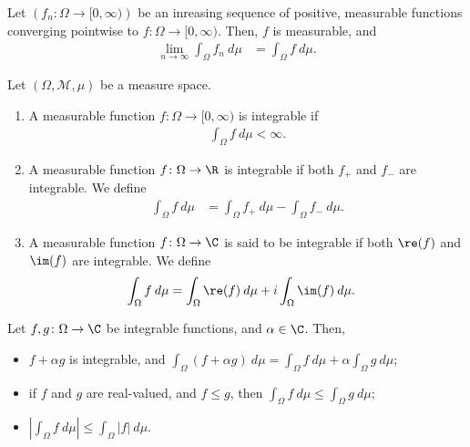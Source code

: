\begin{theorem}
  Let $\left(f_n:\Omega\rightarrow [0,\infty)\right)$ be an inreasing sequence of positive, measurable functions converging pointwise to $f\colon \Omega\rightarrow [0,\infty)$. Then, $f$ is measurable, and
  \begin{align*}
    \lim_{n\rightarrow\infty}\int_{\Omega}^{} f_n\:d\mu &= \int_{\Omega}^{} f\:d\mu.
  \end{align*}
\end{theorem}
\begin{definition}
  Let $\left(\Omega,\mathcal{M},\mu\right)$ be a measure space.
  \begin{enumerate}[(1)]
    \item A measurable function $f\colon \Omega\rightarrow [0,\infty)$ is integrable if
      \begin{align*}
        \int_{\Omega}^{} f\:d\mu < \infty.
      \end{align*}
    \item A measurable function $f\colon \Omega\rightarrow \R$ is integrable if both $f_{+}$ and $f_{-}$ are integrable. We define
      \begin{align*}
        \int_{\Omega}^{} f\:d\mu &= \int_{\Omega}^{} f_{+}\:d\mu - \int_{\Omega}^{} f_{-}\:d\mu.
      \end{align*}
    \item A measurable function $f\colon \Omega\rightarrow \C$ is said to be integrable if both $\re(f)$ and $\im(f)$ are integrable. We define
      \begin{align*}
        \int_{\Omega}^{} f\:d\mu &= \int_{\Omega}^{} \re(f)\:d\mu + i\int_{\Omega}^{} \im(f)\:d\mu.
      \end{align*}
  \end{enumerate}
\end{definition}
\begin{fact}
  Let $f,g\colon \Omega\rightarrow \C$ be integrable functions, and $\alpha\in\C$. Then,
  \begin{itemize}
    \item $f + \alpha g$ is integrable, and $\displaystyle \int_{\Omega}^{} \left(f + \alpha g\right)\:d\mu = \int_{\Omega}f\:d\mu + \alpha\int_{\Omega}g\:d\mu$;
    \item if $f$ and $g$ are real-valued, and $f\leq g$, then $\displaystyle \int_{\Omega}^{} f\:d\mu \leq \int_{\Omega}^{} g\:d\mu$;
    \item $\displaystyle \left\vert \int_{\Omega}^{} f\:d\mu \right\vert\leq \int_{\Omega}^{} \left\vert f \right\vert\:d\mu$.
  \end{itemize}
\end{fact}
